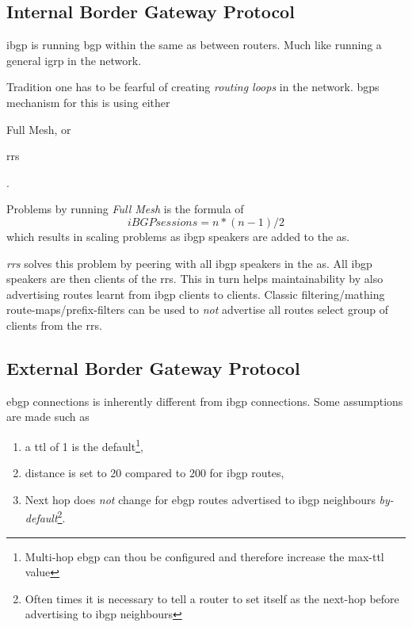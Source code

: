 \subsection[iBGP]{Internal Border Gateway Protocol}

\gls{ibgp} is running \gls{bgp} within the same \gls{as} between routers. Much like running a general \gls{igrp} in the network.

Tradition one has to be fearful of creating \textit{routing loops} in the network. \glspl{bgp} mechanism for this is using either \begin{mylist} \item Full Mesh, or \item \glspl{rr} \end{mylist}.

Problems by running \textit{Full Mesh} is the formula of \[ iBGPsessions = n*(n-1)/2 \]  which results in scaling problems as \gls{ibgp} speakers are added to the \gls{as}.

\textit{\glspl{rr}} solves this problem by peering with all \gls{ibgp} speakers in the \gls{as}. All \gls{ibgp} speakers are then clients of the \glspl{rr}. This in turn helps maintainability by also advertising routes learnt from \gls{ibgp} clients to clients. Classic filtering/mathing route-maps/prefix-filters can be used to \textit{not} advertise all routes select group of clients from the \glspl{rr}.

\subsection[eBGP]{External Border Gateway Protocol}

\gls{ebgp} connections is inherently different from \gls{ibgp} connections. Some assumptions are made such as
\begin{enumerate}
    \item a \gls{ttl} of 1 is the default\footnote{Multi-hop \gls{ebgp} can thou be configured and therefore increase the max-\gls{ttl} value},
    \item distance is set to 20 compared to 200 for \gls{ibgp} routes,
    \item Next hop does \textit{not} change for \gls{ebgp} routes advertised to \gls{ibgp} neighbours \textit{by-default}\footnote{Often times it is necessary to tell a router to set itself as the next-hop before advertising to \gls{ibgp} neighbours}.
\end{enumerate}